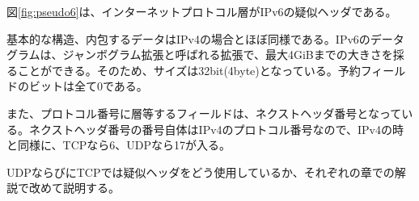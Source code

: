図\ref{fig:pseudo6}は、インターネットプロトコル層がIPv6の疑似ヘッダである。

基本的な構造、内包するデータはIPv4の場合とほぼ同様である。IPv6のデータグラムは、ジャンボグラム拡張と呼ばれる拡張で、最大4GiBまでの大きさを採ることができる。そのため、サイズは32bit(4byte)となっている。予約フィールドのビットは全て0である。

また、プロトコル番号に層等するフィールドは、ネクストヘッダ番号となっている。ネクストヘッダ番号の番号自体はIPv4のプロトコル番号なので、IPv4の時と同様に、TCPなら6、UDPなら17が入る。

UDPならびにTCPでは疑似ヘッダをどう使用しているか、それぞれの章での解説で改めて説明する。

